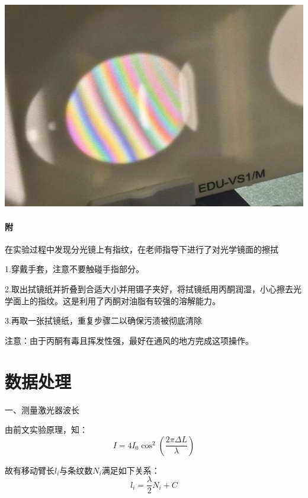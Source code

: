 \documentclass[10pt]{ctexart}
\begin{document}
\begin{itemize}
\begin{minipage}{0.38\textwidth}
        \includegraphics[width=\textwidth]{图片4.jpg}
    \end{minipage}
\end{itemize}
\paragraph{附}
在实验过程中发现分光镜上有指纹，在老师指导下进行了对光学镜面的擦拭

1.穿戴手套，注意不要触碰手指部分。

2.取出拭镜纸并折叠到合适大小并用镊子夹好，将拭镜纸用丙酮润湿，小心擦去光学面上的指纹。这是利用了丙酮对油脂有较强的溶解能力。

3.再取一张拭镜纸，重复步骤二以确保污渍被彻底清除

注意：由于丙酮有毒且挥发性强，最好在通风的地方完成这项操作。
\section{数据处理}
一、测量激光器波长

由前文实验原理，知：
\[I=4I_0\cos^2(\frac{2\pi\Delta L}{\lambda})\]

故有移动臂长$l_i$与条纹数$N_i$满足如下关系：
\[l_i=\frac{\lambda}{2} N_i+C\]
\end{document}
